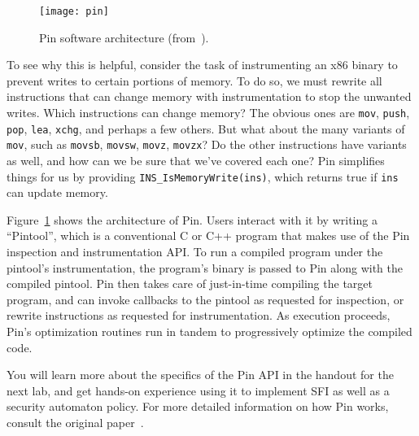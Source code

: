\documentclass[11pt,twoside]{scrartcl}
\begin{document}
\begin{figure}[t]
\centering
\texttt{[image: pin]}
\caption{Pin software architecture (from~\cite{Luk2005}).}
\label{fig:pin}
\end{figure}

To see why this is helpful, consider the task of instrumenting an x86 binary to prevent writes to certain portions of memory. To do so, we must rewrite all instructions that can change memory with instrumentation to stop the unwanted writes. Which instructions can change memory? The obvious ones are \verb'mov', \verb'push', \verb'pop', \verb'lea', \verb'xchg', and perhaps a few others. But what about the many variants of \verb'mov', such as \verb'movsb', \verb'movsw', \verb'movz', \verb'movzx'? Do the other instructions have variants as well, and how can we be sure that we've covered each one? Pin simplifies things for us by providing \verb'INS_IsMemoryWrite(ins)', which returns true if \verb'ins' can update memory.

Figure~\ref{fig:pin} shows the architecture of Pin. Users interact with it by writing a ``Pintool'', which is a conventional C or C++ program that makes use of the Pin inspection and instrumentation API. To run a compiled program under the pintool's instrumentation, the program's binary is passed to Pin along with the compiled pintool. Pin then takes care of just-in-time compiling the target program, and can invoke callbacks to the pintool as requested for inspection, or rewrite instructions as requested for instrumentation. As execution proceeds, Pin's optimization routines run in tandem to progressively optimize the compiled code.

You will learn more about the specifics of the Pin API in the handout for the next lab, and get hands-on experience using it to implement SFI as well as a security automaton policy. For more detailed information on how Pin works, consult the original paper~\cite{Luk2005}.



\end{document}
